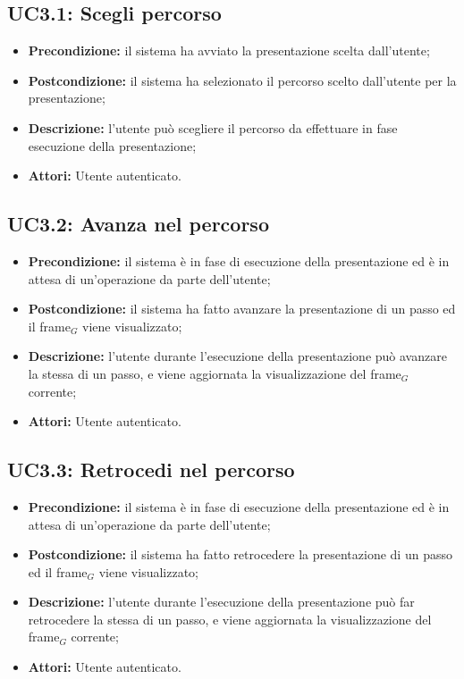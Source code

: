 \subsection{ UC3.1: Scegli percorso}

\begin{itemize}
	\item \textbf{Precondizione:} il sistema ha avviato la presentazione scelta dall'utente;
	\item \textbf{Postcondizione:} il sistema ha selezionato il percorso scelto dall'utente per la presentazione;
	\item \textbf{Descrizione:} l'utente può scegliere il percorso da effettuare in fase esecuzione della presentazione;
	\item \textbf{Attori:} Utente autenticato.
\end{itemize}
\subsection{ UC3.2: Avanza nel percorso}

\begin{itemize}
	\item \textbf{Precondizione:} il sistema è in fase di esecuzione della presentazione ed è in attesa di un'operazione da parte dell'utente;
	\item \textbf{Postcondizione:} il sistema ha fatto avanzare la presentazione di un passo ed il frame$_G$ viene visualizzato;
	\item \textbf{Descrizione:} l'utente durante l'esecuzione della presentazione può avanzare la stessa di un passo, e viene aggiornata la visualizzazione del frame$_G$ corrente;
	\item \textbf{Attori:} Utente autenticato.
\end{itemize}
\subsection{ UC3.3: Retrocedi nel percorso}

\begin{itemize}
	\item \textbf{Precondizione:} il sistema è in fase di esecuzione della presentazione ed è in attesa di un'operazione da parte dell'utente;
	\item \textbf{Postcondizione:} il sistema ha fatto retrocedere la presentazione di un passo ed il frame$_G$ viene visualizzato;
	\item \textbf{Descrizione:} l'utente durante l'esecuzione della presentazione può far retrocedere la stessa di un passo, e viene aggiornata la visualizzazione del frame$_G$ corrente;
	\item \textbf{Attori:} Utente autenticato.
\end{itemize}
